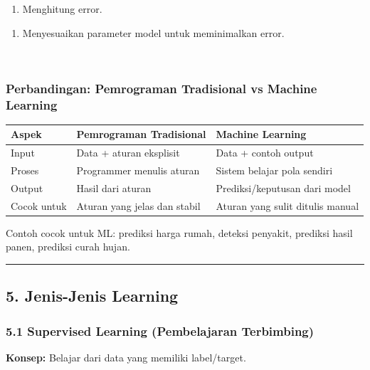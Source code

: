 \documentclass[12pt,a4paper]{article}
\begin{document}
\begin{enumerate}
\item Menghitung error.
\end{enumerate}

\begin{enumerate}
\item Menyesuaikan parameter model untuk meminimalkan error.
\end{enumerate}


\\[
\text{Error} = y - \hat{y}
\\]


\subsubsection{Perbandingan: Pemrograman Tradisional vs Machine Learning}

\begin{tabular}{|l|l|l|}
\hline
Aspek & Pemrograman Tradisional & Machine Learning \\
\hline
Input & Data + aturan eksplisit & Data + contoh output \\
\hline
Proses & Programmer menulis aturan & Sistem belajar pola sendiri \\
\hline
Output & Hasil dari aturan & Prediksi/keputusan dari model \\
\hline
Cocok untuk & Aturan yang jelas dan stabil & Aturan yang sulit ditulis manual \\
\hline
\end{tabular}


Contoh cocok untuk ML: prediksi harga rumah, deteksi penyakit, prediksi hasil panen, prediksi curah hujan.


\hrule


\subsection{5. Jenis-Jenis Learning}

\subsubsection{5.1 Supervised Learning (Pembelajaran Terbimbing)}

\textbf{Konsep:} Belajar dari data yang memiliki label/target.


\\[
(X, y) \rightarrow \text{Model} \rightarrow \hat{y}
\\]
\end{document}
